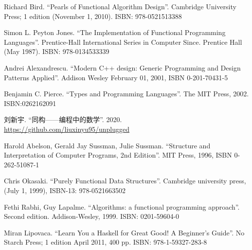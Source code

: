 \documentclass[b5paper]{ctexart}
\begin{document}
\begin{Exercise}
{\begin{center}
\label{fig:circular-list}
\end{center}
}
\end{Exercise}

\ifx\wholebook\relax \else
\begin{thebibliography}{99}

Richard Bird. ``Pearls of Functional Algorithm Design''. Cambridge University Press; 1 edition (November 1, 2010). ISBN: 978-0521513388

Simon L. Peyton Jones. ``The Implementation of Functional Programming Languages''. Prentice-Hall International Series in Computer Since. Prentice Hall (May 1987). ISBN: 978-0134533339

Andrei Alexandrescu. ``Modern C++ design: Generic Programming and Design Patterns Applied''. Addison Wesley February 01, 2001, ISBN 0-201-70431-5

Benjamin C. Pierce. ``Types and Programming Languages''. The MIT Press, 2002. ISBN:0262162091

刘新宇. ``同构——编程中的数学''. 2020. \url{https://github.com/liuxinyu95/unplugged}

Harold Abelson, Gerald Jay Sussman, Julie Sussman. ``Structure and Interpretation of Computer Programs, 2nd Edition''. MIT Press, 1996, ISBN 0-262-51087-1

Chris Okasaki. ``Purely Functional Data Structures''. Cambridge university press, (July 1, 1999), ISBN-13: 978-0521663502

Fethi Rabhi, Guy Lapalme. ``Algorithms: a functional programming approach''. Second edition. Addison-Wesley, 1999. ISBN: 0201-59604-0

Miran Lipovaca. ``Learn You a Haskell for Great Good! A Beginner's Guide''. No Starch Press; 1 edition April 2011, 400 pp. ISBN: 978-1-59327-283-8


\end{thebibliography}
\end{document}

